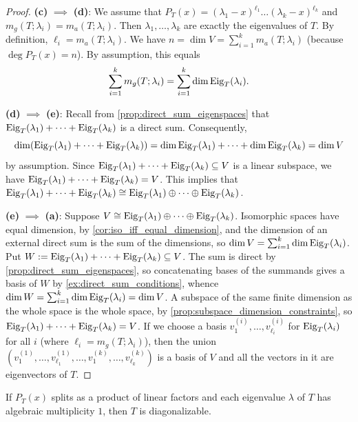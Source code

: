 \begin{proof}
  \textbf{(c)} $\implies$ \textbf{(d)}: We assume that $P_T(x) = (\lambda_1 - x)^{\ell_1} \dots (\lambda_k - x)^{\ell_k}$ and $m_g(T; \lambda_i) = m_a(T; \lambda_i)$.
  Then $\lambda_1, \dots, \lambda_k$ are exactly the eigenvalues of $T$. By definition, $\ell_i = m_a(T; \lambda_i)$.
  We have $n = \dim V = \sum_{i=1}^k m_a(T; \lambda_i)$ (because $\deg P_T(x) = n$).
  By assumption, this equals \[ \sum_{i=1}^k m_g(T; \lambda_i) = \sum_{i=1}^k \dim \operatorname{Eig}_T(\lambda_i). \]

  \textbf{(d)} $\implies$ \textbf{(e)}: Recall from \cref{prop:direct_sum_eigenspaces} that $\operatorname{Eig}_T(\lambda_1) + \dots + \operatorname{Eig}_T(\lambda_k)$ is a direct sum.
  Consequently, \[ \dim(\operatorname{Eig}_T(\lambda_1) + \dots + \operatorname{Eig}_T(\lambda_k)) = \dim \operatorname{Eig}_T(\lambda_1) + \dots + \dim \operatorname{Eig}_T(\lambda_k) = \dim V \] by assumption.
  Since $\operatorname{Eig}_T(\lambda_1) + \dots + \operatorname{Eig}_T(\lambda_k) \subseteq V$ is a linear subspace, we have $\operatorname{Eig}_T(\lambda_1) + \dots + \operatorname{Eig}_T(\lambda_k) = V$.
  This implies that $\operatorname{Eig}_T(\lambda_1) + \dots + \operatorname{Eig}_T(\lambda_k) \cong \operatorname{Eig}_T(\lambda_1) \oplus \dots \oplus \operatorname{Eig}_T(\lambda_k)$.

  \textbf{(e)} $\implies$ \textbf{(a)}: Suppose $V \cong \operatorname{Eig}_T(\lambda_1) \oplus \dots \oplus \operatorname{Eig}_T(\lambda_k)$. Isomorphic spaces have equal dimension, by \cref{cor:iso_iff_equal_dimension}, and the dimension of an external direct sum is the sum of the dimensions, so $\dim V = \sum_{i=1}^k \dim \operatorname{Eig}_T(\lambda_i)$. Put $W := \operatorname{Eig}_T(\lambda_1) + \dots + \operatorname{Eig}_T(\lambda_k) \subseteq V$. The sum is direct by \cref{prop:direct_sum_eigenspaces}, so concatenating bases of the summands gives a basis of $W$ by \cref{ex:direct_sum_conditions}, whence $\dim W = \sum_{i=1}^k \dim \operatorname{Eig}_T(\lambda_i) = \dim V$. A subspace of the same finite dimension as the whole space is the whole space, by \cref{prop:subspace_dimension_constraints}, so $\operatorname{Eig}_T(\lambda_1) + \dots + \operatorname{Eig}_T(\lambda_k) = V$.
  If we choose a basis $v_1^{(i)}, \dots, v_{\ell_i}^{(i)}$ for $\operatorname{Eig}_T(\lambda_i)$ for all $i$ (where $\ell_i = m_g(T; \lambda_i)$), then the union $(v_1^{(1)}, \dots, v_{\ell_1}^{(1)}, \dots, v_1^{(k)}, \dots, v_{\ell_k}^{(k)})$ is a basis of $V$ and all the vectors in it are eigenvectors of $T$.
\end{proof}

\begin{corollary}\label{cor:sufficient_diag}
  If $P_T(x)$ splits as a product of linear factors and each eigenvalue $\lambda$ of $T$ has algebraic multiplicity $1$, then $T$ is diagonalizable.
\end{corollary}

